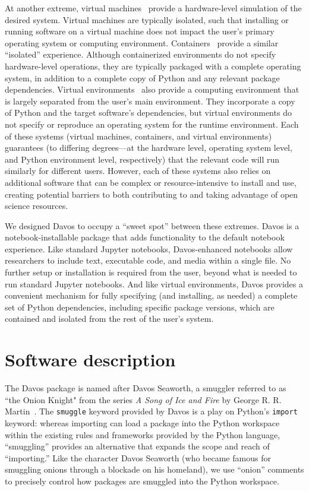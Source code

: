 \documentclass[preprint,12pt,a4paper]{elsarticle}
\begin{document}
At another extreme, virtual machines~\cite{Gold74, AltiEtal05, Rose99}
provide a hardware-level simulation of the desired system.  Virtual
machines are typically isolated, such that installing or running
software on a virtual machine does not impact the user's primary
operating system or computing environment.
Containers~\cite[e.g.,][]{Merk14, KurtEtal17} provide a similar
``isolated'' experience. Although containerized environments do not
specify hardware-level operations, they are typically packaged with a
complete operating system, in addition to a complete copy of Python
and any relevant package dependencies. Virtual
environments~\cite[e.g.,][]{Anac12, Eust19} also provide a computing
environment that is largely separated from the user's main
environment. They incorporate a copy of Python and the target
software's dependencies, but virtual environments do not specify or
reproduce an operating system for the runtime environment. Each of
these systems (virtual machines, containers, and virtual environments)
guarantees (to differing degrees---at the hardware level, operating
system level, and Python environment level, respectively) that the
relevant code will run similarly for different users. However, each of
these systems also relies on additional software that can be complex
or resource-intensive to install and use, creating potential barriers
to both contributing to and taking advantage of open science
resources.

We designed Davos to occupy a ``sweet spot'' between these extremes.
Davos is a notebook-installable package that adds functionality to the
default notebook experience. Like standard Jupyter notebooks,
Davos-enhanced notebooks allow researchers to include text, executable
code, and media within a single file. No further setup or installation is
required from the user, beyond what is needed to run standard Jupyter
notebooks. And like virtual environments, Davos provides a convenient
mechanism for fully specifying (and installing, as needed) a complete set of
Python dependencies, including specific package versions, which are contained
and isolated from the rest of the user's system.


\section{Software description}

The Davos package is named after Davos Seaworth, a smuggler referred
to as ``the Onion Knight" from the series \textit{A Song of Ice and Fire} by
George R. R. Martin~\cite{Mart98}. The \texttt{smuggle} keyword provided by
Davos is a play on Python's \texttt{import} keyword: whereas importing
can load a package into the Python workspace within the existing rules and
frameworks provided by the Python language, ``smuggling'' provides an
alternative that expands the scope and reach of ``importing.'' Like the
character Davos Seaworth (who became famous for smuggling onions through a
blockade on his homeland), we use ``onion'' comments to precisely control how
packages are smuggled into the Python workspace.
\end{document}
